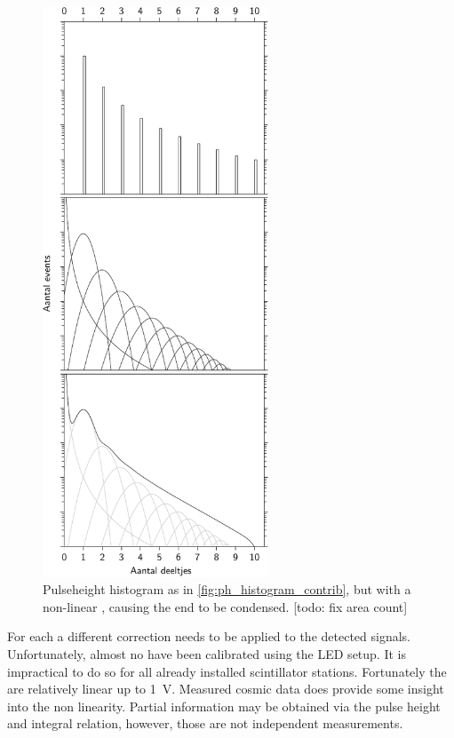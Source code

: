 \begin{figure}
    \centering
    \includegraphics[width=0.6\textwidth]
                    {plots/station/ph_histogram_contrib_nonlin}
    \caption{Pulseheight histogram as in \cref{fig:ph_histogram_contrib}, but with a non-linear \pmt, causing the end to be condensed. [todo: fix area count]}
    \label{fig:ph_histogram_contrib_nonlin}
\end{figure}

For each \senstech \pmt a different correction needs to be applied to the detected signals. Unfortunately, almost no \pmts have been calibrated using the LED setup. It is impractical to do so for all already installed scintillator stations. Fortunately the \pmts are relatively linear up to \SI{1}{\volt}. Measured cosmic data does provide some insight into the non linearity. Partial information may be obtained via the pulse height and integral relation, however, those are not independent measurements.


